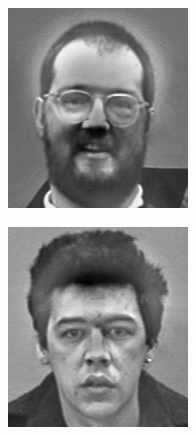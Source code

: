 \begin{figure}
\begin{subfigure}[b]{0.3\textwidth}
\includegraphics[width=\textwidth]{differenceFace0.png}
\end{subfigure}
\begin{subfigure}[b]{0.3\textwidth}
\includegraphics[width=\textwidth]{differenceFace1.png}

\end{subfigure}
\end{figure}
